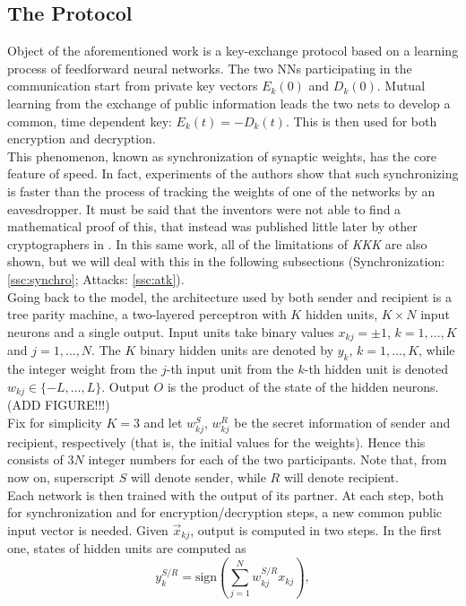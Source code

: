 \documentclass[%
    corpo=11pt,
    twoside,
    stile=classica,
    oldstyle,
    autoretitolo,
    tipotesi=magistrale,
    greek,
    evenboxes,
    english
]{toptesi}
\newcommand{\sign}{\text{sign}}
\begin{document}
\subsection{The Protocol}
Object of the aforementioned work is a key-exchange protocol based on a learning process of feedforward neural networks. The two NNs participating in the communication start from private key vectors $E_k(0)$ and $D_k(0)$. Mutual learning from the exchange of public information leads the two nets to develop a common, time dependent key: $E_k(t) = - D_k(t)$. This is then used for both encryption and decryption. \\
This phenomenon, known as synchronization of synaptic weights, has the core feature of speed. In fact, experiments of the authors show that such synchronizing is faster than the process of tracking the weights of one of the networks by an eavesdropper. It must be said that the inventors were not able to find a mathematical proof of this, that instead was published little later by other cryptographers in \cite{shamir}. In this same work, all of the limitations of \textit{KKK} are also shown, but we will deal with this in the following subsections (Synchronization: \ref{ssc:synchro}; Attacks: \ref{ssc:atk}).  \\
Going back to the model, the architecture used by both sender and recipient is a tree parity machine, a two-layered perceptron with $K$ hidden units, $K \times N$ input neurons and a single output. Input units take binary values $x_{kj} = \pm 1$, $k = 1,\dots, K$ and $j = 1, \dots, N$. The $K$ binary hidden units are denoted by $y_k$, $k = 1,\dots, K$, while the integer weight from the $j$-th input unit from the $k$-th hidden unit is denoted $w_{kj}\in\{-L,\dots,L\}$. Output $O$ is the product of the state of the hidden neurons. (ADD FIGURE!!!) \\
Fix for simplicity $K = 3$ and let $w_{kj}^S$, $w_{kj}^R$ be the secret information of sender and recipient, respectively (that is, the initial values for the weights). Hence this consists of $3N$ integer numbers for each of the two participants.  Note that, from now on, superscript $S$ will denote sender, while $R$ will denote recipient. \\
Each network is then trained with the output of its partner. At each step, both for synchronization and for encryption/decryption steps, a new common public input vector is needed. Given $\vec{x}_{kj}$, output is computed in two steps. In the first one, states of hidden units are computed as 
\begin{equation}
y_k^{S/R} = \sign\left(\sum_{j=1}^{N}w_{kj}^{S/R}x_{kj}\right),
\end{equation}
\end{document}
